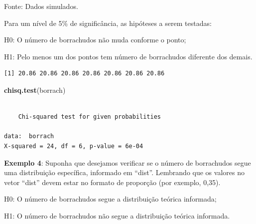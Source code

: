\documentclass[12pt,brazil,]{book}
\newenvironment{Shaded}{\begin{snugshade}}{\end{snugshade}}
\newcommand{\DecValTok}[1]{\textcolor[rgb]{0.00,0.00,0.81}{#1}}
\newcommand{\FloatTok}[1]{\textcolor[rgb]{0.00,0.00,0.81}{#1}}
\newcommand{\KeywordTok}[1]{\textcolor[rgb]{0.13,0.29,0.53}{\textbf{#1}}}
\newcommand{\NormalTok}[1]{#1}
\newcommand{\OperatorTok}[1]{\textcolor[rgb]{0.81,0.36,0.00}{\textbf{#1}}}
\begin{document}
Fonte: Dados simulados.

Para um nível de 5\% de significância, as hipóteses a serem testadas:

H0: O número de borrachudos não muda conforme o ponto;

H1: Pelo menos um dos pontos tem número de borrachudos diferente dos
demais.

\begin{Shaded}
\end{Shaded}

\begin{verbatim}
[1] 20.86 20.86 20.86 20.86 20.86 20.86 20.86
\end{verbatim}

\begin{Shaded}
\begin{Highlighting}[]
\KeywordTok{chisq.test}\NormalTok{(borrach)}
\end{Highlighting}
\end{Shaded}

\begin{verbatim}

    Chi-squared test for given probabilities

data:  borrach
X-squared = 24, df = 6, p-value = 6e-04
\end{verbatim}

\textbf{Exemplo 4}: Suponha que desejamos verificar se o número de
borrachudos segue uma distribuição específica, informado em ``dist''.
Lembrando que os valores no vetor ``dist'' devem estar no formato de
proporção (por exemplo, 0,35).

H0: O número de borrachudos segue a distribuição teórica informada;

H1: O número de borrachudos não segue a distribuição teórica informada.

\begin{Shaded}
\end{Shaded}
\end{document}
